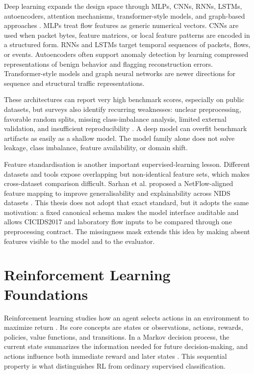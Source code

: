 Deep learning expands the design space through MLPs, CNNs, RNNs, LSTMs, autoencoders, attention mechanisms, transformer-style models, and graph-based approaches \parencite{Xiao2021DLIDSSurvey,Asadullah2023MLIDSSurvey,Sayeeduddin2022AINIDS,Nguyen2022BERTFlowNIDS}. MLPs treat flow features as generic numerical vectors. CNNs are used when packet bytes, feature matrices, or local feature patterns are encoded in a structured form. RNNs and LSTMs target temporal sequences of packets, flows, or events. Autoencoders often support anomaly detection by learning compressed representations of benign behavior and flagging reconstruction errors. Transformer-style models and graph neural networks are newer directions for sequence and structural traffic representations.

These architectures can report very high benchmark scores, especially on public datasets, but surveys also identify recurring weaknesses: unclear preprocessing, favorable random splits, missing class-imbalance analysis, limited external validation, and insufficient reproducibility \parencite{LiuLang2019IDSSurvey,Ring2019DatasetSurvey,Arp2020DosDontsMLSecurity}. A deep model can overfit benchmark artifacts as easily as a shallow model. The model family alone does not solve leakage, class imbalance, feature availability, or domain shift.

Feature standardisation is another important supervised-learning lesson. Different datasets and tools expose overlapping but non-identical feature sets, which makes cross-dataset comparison difficult. Sarhan et al. proposed a NetFlow-aligned feature mapping to improve generalisability and explainability across NIDS datasets \parencite{Sarhan2021}. This thesis does not adopt that exact standard, but it adopts the same motivation: a fixed canonical schema makes the model interface auditable and allows CICIDS2017 and laboratory flow inputs to be compared through one preprocessing contract. The missingness mask extends this idea by making absent features visible to the model and to the evaluator.

\section{Reinforcement Learning Foundations}

Reinforcement learning studies how an agent selects actions in an environment to maximize return \parencite{SuttonBarto2018RL}. Its core concepts are states or observations, actions, rewards, policies, value functions, and transitions. In a Markov decision process, the current state summarizes the information needed for future decision-making, and actions influence both immediate reward and later states \parencite{SuttonBarto2018RL}. This sequential property is what distinguishes RL from ordinary supervised classification.

